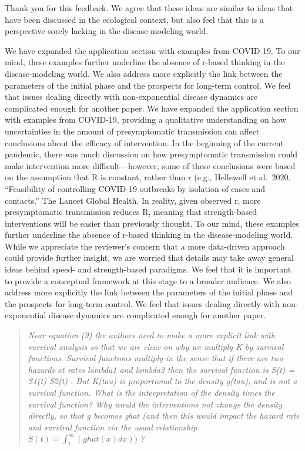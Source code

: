 Thank you for this feedback. We agree that these ideas are similar to
ideas that have been discussed in the ecological context, but also feel
that this is a perspective sorely lacking in the disease-modeling world.

We have expanded the application section with examples from COVID-19. To
our mind, these examples further underline the absence of r-based
thinking in the disease-modeling world. We also address more explicitly
the link between the parameters of the initial phase and the prospects
for long-term control. We feel that issues dealing directly with
non-exponential disease dynamics are complicated enough for another
paper.
We have expanded the
application section with examples from COVID-19, providing a qualitative
understanding on how uncertainties in the amount of presymptomatic
transmission can affect conclusions about the efficacy of intervention.
In the beginning of the current pandemic, there was much discussion on
how presymptomatic transmission could make intervention more
difficult---however, some of these conclusions were based on the
assumption that R is constant, rather than r (e.g., Hellewell et
al.~2020. ``Feasibility of controlling COVID-19 outbreaks by isolation
of cases and contacts.'' The Lancet Global Health. In reality, given
observed r, more presymptomatic transmission reduces R, meaning that
strength-based interventions will be easier than previously thought. To
our mind, these examples further underline the absence of r-based
thinking in the disease-modeling world. While we appreciate the
reviewer's concern that a more data-driven approach could provide
further insight, we are worried that details may take away general ideas
behind speed- and strength-based paradigms. We feel that it is important
to provide a conceptual framework at this stage to a broader audience.
We also address more explicitly the link between the parameters of the
initial phase and the prospects for long-term control. We feel that
issues dealing directly with non-exponential disease dynamics are
complicated enough for another paper.

\begin{quote}\sl
Near equation (9) the authors need to make a more explicit link with
survival analysis so that we are clear on why we multiply K by survival
functions. Survival functions multiply in the sense that if there are
two hazards at rates lambda1 and lambda2 then the survival function is
S(t) = S1(t) S2(t) . But K(tau) is proportional to the density g(tau),
and is not a survival function. What is the interpretation of the
density times the survival function? Why would the interventions not
change the density directly, so that g becomes ghat (and then this would
impact the hazard rate and survival function via the usual relationship
$S(t) = \int_t ^\infty ( ghat (x) dx )  )$ ?
\end{quote}

